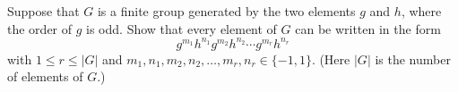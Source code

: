 Suppose that $G$ is a finite group generated by the two elements $g$ and $h$, where the order of $g$ is odd. Show that every element of $G$ can be written in the form
\[
g^{m_1} h^{n_1} g^{m_2} h^{n_2} \cdots g^{m_r} h^{n_r}
\]
with $1 \leq r \leq |G|$ and $m_1, n_1, m_2, n_2, \ldots, m_r, n_r \in \{-1, 1\}$. 
(Here $|G|$ is the number of elements of $G$.)

